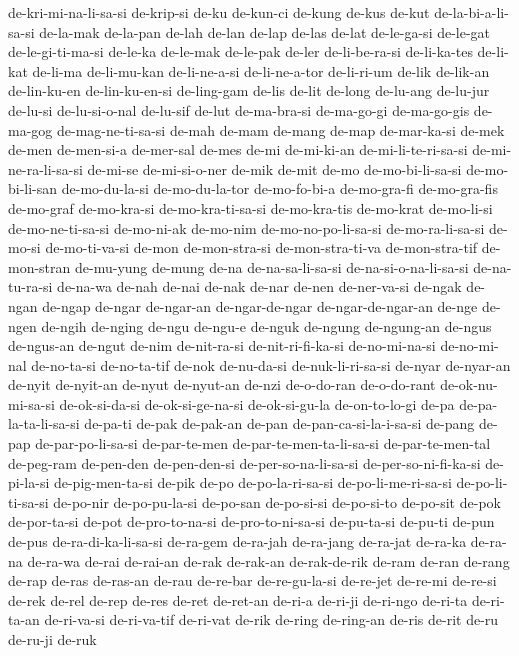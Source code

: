 {de-kri-mi-na-li-sa-si de-krip-si de-ku de-kun-ci de-kung de-kus de-kut
de-la-bi-a-li-sa-si de-la-mak de-la-pan de-lah de-lan de-lap de-las de-lat
de-le-ga-si de-le-gat de-le-gi-ti-ma-si de-le-ka de-le-mak de-le-pak
de-ler de-li-be-ra-si de-li-ka-tes de-li-kat de-li-ma de-li-mu-kan
de-li-ne-a-si de-li-ne-a-tor de-li-ri-um de-lik de-lik-an de-lin-ku-en
de-lin-ku-en-si de-ling-gam de-lis de-lit de-long de-lu-ang de-lu-jur
de-lu-si de-lu-si-o-nal de-lu-sif de-lut de-ma-bra-si de-ma-go-gi
de-ma-go-gis de-ma-gog de-mag-ne-ti-sa-si de-mah de-mam de-mang de-map
de-mar-ka-si de-mek de-men de-men-si-a de-mer-sal de-mes de-mi de-mi-ki-an
de-mi-li-te-ri-sa-si de-mi-ne-ra-li-sa-si de-mi-se de-mi-si-o-ner de-mik
de-mit de-mo de-mo-bi-li-sa-si de-mo-bi-li-san de-mo-du-la-si
de-mo-du-la-tor de-mo-fo-bi-a de-mo-gra-fi de-mo-gra-fis de-mo-graf
de-mo-kra-si de-mo-kra-ti-sa-si de-mo-kra-tis de-mo-krat de-mo-li-si
de-mo-ne-ti-sa-si de-mo-ni-ak de-mo-nim de-mo-no-po-li-sa-si
de-mo-ra-li-sa-si de-mo-si de-mo-ti-va-si de-mon de-mon-stra-si
de-mon-stra-ti-va de-mon-stra-tif de-mon-stran de-mu-yung de-mung de-na
de-na-sa-li-sa-si de-na-si-o-na-li-sa-si de-na-tu-ra-si de-na-wa de-nah
de-nai de-nak de-nar de-nen de-ner-va-si de-ngak de-ngan de-ngap de-ngar
de-ngar-an de-ngar-de-ngar de-ngar-de-ngar-an de-nge de-ngen de-ngih
de-nging de-ngu de-ngu-e de-nguk de-ngung de-ngung-an de-ngus de-ngus-an
de-ngut de-nim de-nit-ra-si de-nit-ri-fi-ka-si de-no-mi-na-si de-no-mi-nal
de-no-ta-si de-no-ta-tif de-nok de-nu-da-si de-nuk-li-ri-sa-si de-nyar
de-nyar-an de-nyit de-nyit-an de-nyut de-nyut-an de-nzi de-o-do-ran
de-o-do-rant de-ok-nu-mi-sa-si de-ok-si-da-si de-ok-si-ge-na-si
de-ok-si-gu-la de-on-to-lo-gi de-pa de-pa-la-ta-li-sa-si de-pa-ti de-pak
de-pak-an de-pan de-pan-ca-si-la-i-sa-si de-pang de-pap de-par-po-li-sa-si
de-par-te-men de-par-te-men-ta-li-sa-si de-par-te-men-tal de-peg-ram
de-pen-den de-pen-den-si de-per-so-na-li-sa-si de-per-so-ni-fi-ka-si
de-pi-la-si de-pig-men-ta-si de-pik de-po de-po-la-ri-sa-si
de-po-li-me-ri-sa-si de-po-li-ti-sa-si de-po-nir de-po-pu-la-si de-po-san
de-po-si-si de-po-si-to de-po-sit de-pok de-por-ta-si de-pot
de-pro-to-na-si de-pro-to-ni-sa-si de-pu-ta-si de-pu-ti de-pun de-pus
de-ra-di-ka-li-sa-si de-ra-gem de-ra-jah de-ra-jang de-ra-jat de-ra-ka
de-ra-na de-ra-wa de-rai de-rai-an de-rak de-rak-an de-rak-de-rik de-ram
de-ran de-rang de-rap de-ras de-ras-an de-rau de-re-bar de-re-gu-la-si
de-re-jet de-re-mi de-re-si de-rek de-rel de-rep de-res de-ret de-ret-an
de-ri-a de-ri-ji de-ri-ngo de-ri-ta de-ri-ta-an de-ri-va-si de-ri-va-tif
de-ri-vat de-rik de-ring de-ring-an de-ris de-rit de-ru de-ru-ji de-ruk
}
